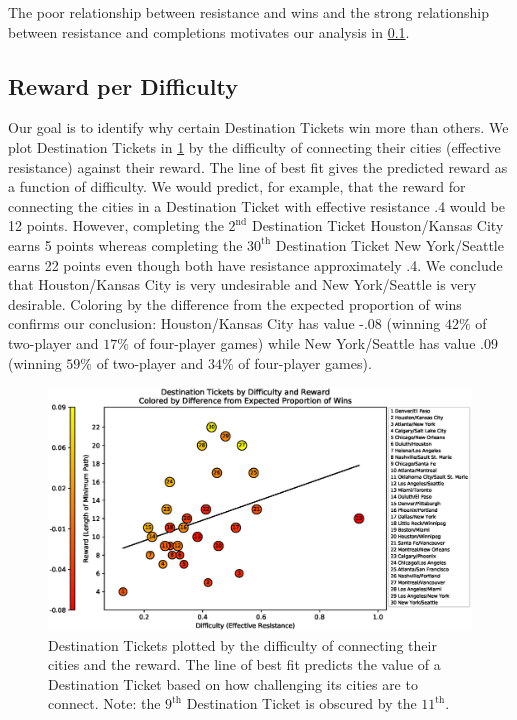 The poor relationship between resistance and wins
and the strong relationship between resistance and
completions motivates our analysis in
\cref{sec:winning_and_resistance}.

\subsection{Reward per Difficulty}
\label{sec:winning_and_resistance}

Our goal is to identify why certain Destination
Tickets win more than others.
We plot Destination Tickets in \cref{fig:resistance}
by the difficulty of connecting their cities (effective
resistance) against their reward.
The line of best fit gives the predicted reward
as a function of difficulty.
We would predict, for example, that the reward for 
connecting the cities
in a Destination Ticket with effective resistance .4 would
be 12 points.
However, completing the $2^\text{nd}$ Destination Ticket 
Houston/Kansas City earns 5 points whereas
completing the $30^\text{th}$ Destination Ticket
New York/Seattle earns 22 points even though
both have resistance approximately .4.
We conclude that Houston/Kansas City is very undesirable
and New York/Seattle is very desirable.
Coloring by the difference from the expected proportion
of wins confirms our conclusion:
Houston/Kansas City has value -.08 (winning $42\%$ of
two-player and $17\%$ of four-player games) while
New York/Seattle has value .09 (winning $59\%$ of
two-player and $34\%$ of four-player games).

\begin{figure}[h]
    \centering
    \includegraphics[scale=.6]{figures/resistance_aggregate}
    \caption{Destination Tickets plotted by the
    difficulty of connecting their cities and the reward.
    The line of best fit predicts the value of a Destination
    Ticket based on how challenging its cities
    are to connect.
    Note: the $9^{\text{th}}$ Destination Ticket 
    is obscured by the $11^{\text{th}}$.}
    \label{fig:resistance}
\end{figure}

